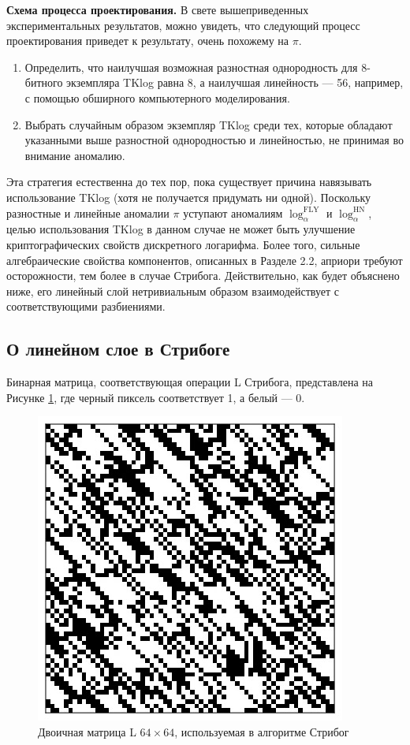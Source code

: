 \textbf{Схема процесса проектирования.} В свете вышеприведенных экспериментальных результатов, можно увидеть, что следующий процесс проектирования приведет к результату, очень похожему на \(\pi\).

\begin{enumerate}
  \item Определить, что наилучшая возможная разностная однородность для 8-битного экземпляра TKlog равна 8, а наилучшая линейность — 56, например, с помощью обширного компьютерного моделирования.
  \item Выбрать случайным образом экземпляр TKlog среди тех, которые обладают указанными выше разностной однородностью и линейностью, не принимая во внимание аномалию.
\end{enumerate}

Эта стратегия естественна до тех пор, пока существует причина навязывать использование TKlog (хотя не получается придумать ни одной). Поскольку  разностные и линейные аномалии \(\pi\) уступают аномалиям \(\log^{\text{FLY}}_\alpha\) и \(\log^{\text{HN}}_\alpha\), целью использования TKlog в данном случае не может быть улучшение криптографических свойств дискретного логарифма. Более того, сильные алгебраические свойства компонентов, описанных в Разделе 2.2, априори требуют осторожности, тем более в случае Стрибога. Действительно, как будет объяснено ниже, его линейный слой нетривиальным образом взаимодействует с соответствующими разбиениями.

\subsection{О линейном слое в Стрибоге}
Бинарная матрица, соответствующая операции L Стрибога, представлена на Рисунке \ref{fig:04}, где черный пиксель соответствует 1, а белый — 0.

\begin{figure}
  \centering
  \includegraphics[scale=0.9]{contents/pics/Streebog_matrix.png}
  \caption{Двоичная матрица L \(64 \times 64\), используемая в алгоритме Стрибог}
  \label{fig:04}
\end{figure}

